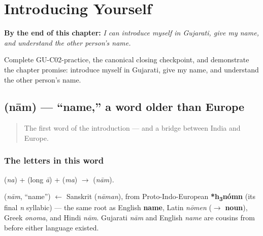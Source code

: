 
\chapter{Introducing Yourself}
\label{ch:introductions}

\begin{chapteropening}
\textbf{By the end of this chapter:} \emph{I can introduce myself in Gujarati, give my name, and understand the other person's name.}

Complete GU-C02-practice, the canonical closing checkpoint, and demonstrate the chapter promise: introduce myself in Gujarati, give my name, and understand the other person's name.
\end{chapteropening}

\section[\gu{નામ}]{ (nām) — \textquotedblleft{}name,\textquotedblright{} a word older than Europe}

\label{lesson:GU-C02-naam}



\begin{quote}
The first word of the introduction — and a bridge between India and Europe.
\end{quote}

\subsection*{The letters in this word}
\textbf{} (\emph{na}) + \textbf{} (long \emph{ā}) + \textbf{} (\emph{ma}) $\to$ \textbf{} (\emph{nām}).

\begin{cousinweb}
\textbf{} (\emph{nām}, \textquotedblleft{}name\textquotedblright{}) $\leftarrow$ Sanskrit \textbf{} (\emph{nāman}), from Proto-Indo-European \textbf{*h\textsubscript{3}nómn} (its final \emph{n} syllabic) — the same root as English \textbf{name}, Latin \emph{nōmen} ($\to$ \textbf{noun}), Greek \emph{onoma}, and Hindi \emph{nām}. Gujarati \emph{nām} and English \emph{name} are cousins from before either language existed.
\end{cousinweb}

